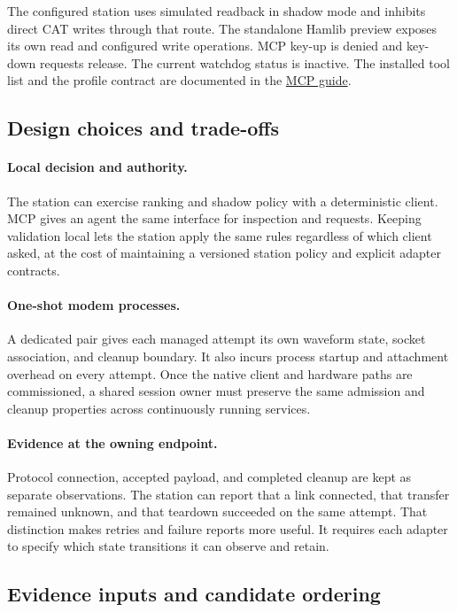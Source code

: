 \documentclass[11pt,a4paper]{article}
\newcommand{\repolink}[2]{\href{https://github.com/8r4n/linkwise/blob/main/#1}{#2}}
\begin{document}
The configured station uses simulated readback in shadow mode and inhibits
direct CAT writes through that route. The standalone Hamlib preview exposes
its own read and configured write operations. MCP key-up is denied and
key-down requests release. The current watchdog status is inactive. The
installed tool list and the profile contract are documented in the
\repolink{rust/docs/mcp-usage.md}{MCP guide}.

\subsection{Design choices and trade-offs}

\paragraph{Local decision and authority.}
The station can exercise ranking and shadow policy with a deterministic
client. MCP gives an agent the same interface for inspection and requests.
Keeping validation local lets the station apply the same rules regardless
of which client asked, at the cost of maintaining a versioned station policy
and explicit adapter contracts.

\paragraph{One-shot modem processes.}
A dedicated pair gives each managed attempt its own waveform state, socket
association, and cleanup boundary. It also incurs process startup and
attachment overhead on every attempt. Once the native client and hardware
paths are commissioned, a shared session owner must preserve the same
admission and cleanup properties across continuously running services.

\paragraph{Evidence at the owning endpoint.}
Protocol connection, accepted payload, and completed cleanup are kept as
separate observations. The station can report that a link connected, that
transfer remained unknown, and that teardown succeeded on the same attempt.
That distinction makes retries and failure reports more useful. It requires
each adapter to specify which state transitions it can observe and retain.

\subsection{Evidence inputs and candidate ordering}
\end{document}

